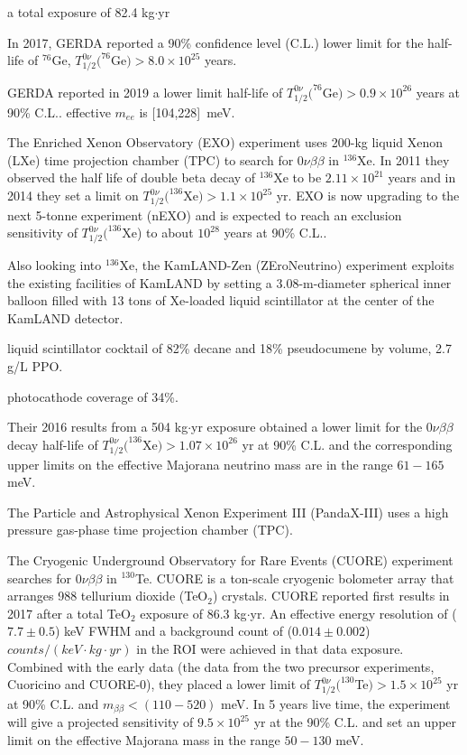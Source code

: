 a total exposure of 82.4 kg$\cdot$yr 

In 2017, GERDA reported a 90\% confidence level (C.L.) lower limit for the half-life of $^{76}$Ge, $T^{0\nu}_{1/2}(^{76}$Ge$)>8.0\times 10^{25}$ years.

GERDA reported in 2019 a lower limit half-life of $T^{0\nu}_{1/2}(^{76}$Ge$)>0.9\times 10^{26}$ years at 90\% C.L.\cite{agostini2019probing}. effective $m_{ee}$ is [104,228]~meV.


The Enriched Xenon Observatory (EXO) experiment uses 200-kg liquid Xenon (LXe) time projection chamber (TPC) to search for $0\nu\beta\beta$ in $^{136}$Xe. In 2011 they observed the half life of double beta decay of $^{136}$Xe to be $2.11\times 10^{21}$ years and in 2014 they set a limit on $T^{0\nu}_{1/2}(^{136}$Xe$)>1.1\times 10^{25}$ yr\cite{albert2014search}. EXO is now upgrading to the next 5-tonne experiment (nEXO) and is expected to reach an exclusion sensitivity of $T^{0\nu}_{1/2}(^{136}$Xe) to about $10^{28}$ years at 90\% C.L.\cite{albert2018sensitivity}.

Also looking into $^{136}$Xe, the KamLAND-Zen (ZEroNeutrino) experiment exploits the existing facilities of KamLAND by setting a 3.08-m-diameter spherical inner balloon filled with 13 tons of Xe-loaded liquid scintillator at the center of the KamLAND detector.

liquid scintillator cocktail of 82\% decane and 18\% pseudocumene by volume, 2.7 g/L PPO.

photocathode coverage of 34\%.

Their 2016 results from a 504 kg$\cdot$yr exposure obtained a lower limit for the $0\nu\beta\beta$ decay half-life of $T^{0\nu}_{1/2}(^{136}$Xe$)>1.07\times 10^{26}$ yr at 90\% C.L. and the corresponding upper limits on the effective Majorana neutrino mass are in the range $61-165$ meV\cite{gando2016search}.

The Particle and Astrophysical Xenon Experiment III (PandaX-III) uses a high pressure gas-phase time projection chamber (TPC).

The Cryogenic Underground Observatory for Rare Events (CUORE) experiment searches for $0\nu\beta\beta$ in $^{130}$Te. CUORE is a ton-scale cryogenic bolometer array that arranges 988 tellurium dioxide (TeO$_2$) crystals. CUORE reported first results in 2017 after a total TeO$_2$ exposure of 86.3 kg$\cdot$yr. An effective energy resolution of ($7.7\pm 0.5$) keV FWHM and a background count of ($0.014\pm0.002$) $counts/(keV\cdot kg\cdot yr)$ in the ROI were achieved in that data exposure. Combined with the early data (the data from the two precursor experiments, Cuoricino and CUORE-0), they placed a lower limit of $T^{0\nu}_{1/2}(^{130}$Te$)>1.5\times 10^{25}$ yr at 90\% C.L. and $m_{\beta\beta}<(110-520)$ meV\cite{alduino2018first}. In 5 years live time, the experiment will give a projected sensitivity of $9.5\times 10^{25}$ yr at the 90\% C.L. and set an upper limit on the effective Majorana mass in the range $50-130$ meV\cite{piperno2015dark}.

